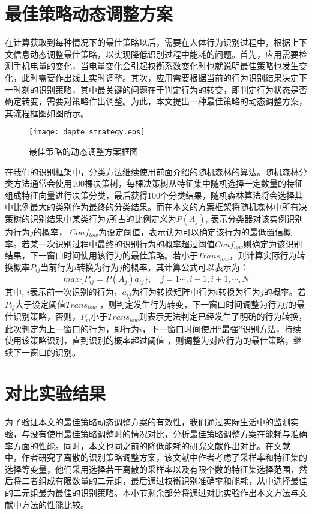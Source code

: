 \section{最佳策略动态调整方案}
\par 在计算获取到每种情况下的最佳策略以后，需要在人体行为识别过程中，根据上下文信息动态调整最佳策略，以实现降低识别过程中能耗的问题。首先，应用需要检测手机电量的变化，当电量变化会引起权衡系数变化时也就说明最佳策略也发生变化，此时需要作出线上实时调整。其次，应用需要根据当前的行为识别结果决定下一时刻的识别策略，其中最关键的问题在于判定行为的转变，即判定行为状态是否确定转变，需要对策略作出调整。为此，本文提出一种最佳策略的动态调整方案，其流程框图如图所示。
\begin{figure}[ht]
\centering
\texttt{[image: dapte\_strategy.eps]}
\caption{最佳策略的动态调整方案框图}
\end{figure}

\par 在我们的识别框架中，分类方法继续使用前面介绍的随机森林的算法。随机森林分类方法通常会使用100棵决策树，每棵决策树从特征集中随机选择一定数量的特征组成特征向量进行决策分类，最后获得100个分类结果，随机森林算法将会选择其中比例最大的类别作为最终的分类结果。而在本文的方案框架将随机森林中所有决策树的识别结果中某类行为$j$所占的比例定义为$P(A_j)$, 表示分类器对该实例识别为行为$j$的概率， $Conf_{low}$为设定阈值，表示认为可以确定该行为的最低置信概率。若某一次识别过程中最终的识别行为的概率超过阈值$Conf_{low}$则确定为该识别结果，下一窗口时间使用该行为的最佳策略。若小于$Trans_{low}$，则计算实际行为转换概率$P_{ij}$当前行为$i$转换为行为$j$的概率，其计算公式可以表示为：
\begin{equation}
	max \{P_{ij} = P(A_j)a_{ij}\}, \quad j = 1 \cdots, i-1, i+1, \cdots, N
\end{equation}
其中, $i$表示前一次识别的行为，$a_{ij}$为行为转换矩阵中行为$i$转换为行为$j$的概率。若$P_{ij}$大于设定阈值$Trans_{low}$ ，则判定发生行为转变，下一窗口时间调整为行为$j$的最佳识别策略，否则，$P_{ij}$小于$Trans_{low}$则表示无法判定已经发生了明确的行为转换，此次判定为上一窗口的行为，即行为$i$，下一窗口时间使用“最强”识别方法，持续使用该策略识别，直到识别的概率超过阈值 ，则调整为对应行为的最佳策略，继续下一窗口的识别。
\section{对比实验结果}
\par 为了验证本文的最佳策略动态调整方案的有效性，我们通过实际生活中的监测实验，与没有使用最佳策略调整时的情况对比，分析最佳策略调整方案在能耗与准确率方面的性能。同时，本文也同之前的降低能耗的研究文献作出对比。在文献　\cite{}　　　中，作者研究了离散的识别策略调整方案，该文献中作者考虑了采样率和特征集的选择等变量，他们采用选择若干离散的采样率以及有限个数的特征集选择范围，然后将二者组成有限数量的二元组，最后通过权衡识别准确率和能耗，从中选择最佳的二元组最为最佳的识别策略。本小节剩余部分将通过对比实验作出本文方法与文献中方法的性能比较。
